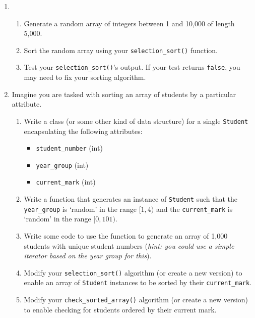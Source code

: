 \documentclass[11pt,a4paper]{report}
\begin{document}
\begin{enumerate}
\item 
    \begin{enumerate}
        \item Generate a random array of integers between 1 and 10,000 of length 5,000.  
        \item Sort the random array using your \texttt{selection\_sort()} function.
        \item Test your \texttt{selection\_sort()}'s output. If your test returns \texttt{false}, you may need to fix your sorting algorithm.
    \end{enumerate}

\item Imagine you are tasked with sorting an array of students by a particular attribute.
    \begin{enumerate}
        \item Write a class (or some other kind of data structure) for a single \texttt{Student} encapsulating the following attributes:
            \begin{itemize}
                \item \texttt{student\_number} (int)
                \item \texttt{year\_group} (int)
                \item \texttt{current\_mark} (int)
            \end{itemize}
        \item Write a function that generates an instance of \texttt{Student} such that the \texttt{year\_group} is `random' in the range $[1,4)$ and the \texttt{current\_mark} is `random' in the range $[0,101)$.
        \item Write some code to use the function to generate an array of 1,000 students with unique student numbers (\textit{hint: you could use a simple iterator based on the year group for this}).
        \item Modify your \texttt{selection\_sort()} algorithm (or create a new version) to enable an array of \texttt{Student} instances to be sorted by their \texttt{current\_mark}.
        \item Modify your \texttt{check\_sorted\_array()} algorithm (or create a new version) to enable checking for students ordered by their current mark.
    \end{enumerate}


\end{enumerate}
\end{document}
